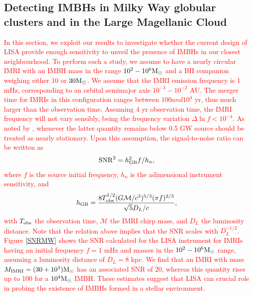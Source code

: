 \documentclass[twocolumn]{aastex62}
\newcommand{\Ms}{{\rm M}_\odot}
\newcommand{\imri}{{\rm IMRI}}
\newcommand{\manuel}{\textcolor{red}}
\begin{document}
\subsection{Detecting IMBHs in Milky Way globular clusters and in the Large Magellanic Cloud}
\manuel{
In this section, we exploit our results to investigate whether the current design of LISA provide enough sensitivity to unveil the presence of IMBHs in our closest neighbourhood. 
To perform such a study, we assume to have a nearly circular IMRI with an IMBH mass in the range $10^2-10^6\Ms$ and a BH companion weighing either $10$ or $30\Ms$. 
We assume that the IMRI emission frequency is 1 mHz, corresponding to an orbital semimajor axis $10^{-3}-10^{-2}$ AU. 
The merger time for IMRIs in this configuration ranges between $100 and 10^4$ yr, thus much larger than the observation time. Assuming 4 yr observation time, the IMRI frequency will not vary sensibly, being the frequency variation $\Delta \ln f < 10^{-4}$. As noted by \cite{robson19}, whenever the latter quantity remains below 0.5 GW source should be treated as nearly stationary. Upon this assumption, the signal-to-noise ratio can be written as
\begin{equation}
    {\rm SNR}^2 = h_{\rm GB}^2 f / h_n,
\end{equation}
where $f$ is the source initial frequency, $h_n$ is the adimensional instrument sensitivity, and 
\begin{equation*}
    h_{\rm GB} = \frac{8T_{\rm obs}^{1/2} (G\mathcal{M}/c^3)^{5/3} (\pi f)^{2/3}}{\sqrt{5}D_L/c},
\end{equation*}
with $T_{\rm obs}$ the observation time, $\mathcal{M}$ the IMRI chirp mass, and $D_L$ the luminosity distance. Note that the relation above implies that the SNR scales with $D_L^{-1/2}$.
Figure \ref{SNRMW} shows the SNR calculated for the LISA instrument for IMRIs having an initial frequency $f=1$ mHz and masses in the $10^2-10^6 \Ms$ range, assuming a luminosity distance of $D_L = 8$ kpc. 
We find that an IMRI with mass $M_\imri = (30 + 10^3)\Ms$ has an associated SNR of 20, whereas this quantity rises up to 100 for a $10^4\Ms$ IMBH. 
These estimates suggest that LISA can crucial role in probing the existence of IMBHs formed in a stellar environment. 
\begin{figure}
    \centering

\end{figure}}
\end{document}
